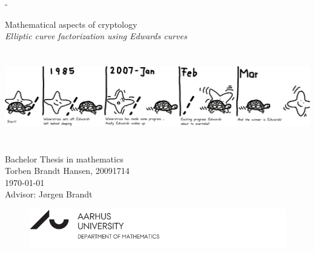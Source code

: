 %
%

  \calccentering{\unitlength}
  \begin{adjustwidth*}{\unitlength}{-\unitlength}
    \vspace*{2cm}
    \centering
    \scshape
    
    {\huge
    Mathematical aspects of cryptology \\
    \vspace*{\onelineskip} 
    \Large{\textit{Elliptic curve factorization using Edwards curves}}}
    
    \vspace*{6\onelineskip}
    
	\includegraphics[width=16cm,height=4cm]{half-race_3}    
	
	\vspace*{3\onelineskip}
    
    {\large
    \linespread{1.4}\selectfont
    Bachelor Thesis in mathematics \\
    Torben Brandt Hansen, 20091714 \\
    \today \\
    Advisor: Jørgen Brandt \\ }
    \begin{figure}[b]
		\centering
		\includegraphics[width=\textwidth]{alt-logo-t-1a171b-en}
	\end{figure}
    \strut\vfill
  \end{adjustwidth*}
  \newpage
  \thispagestyle{empty} %
  \strut\vfill %
